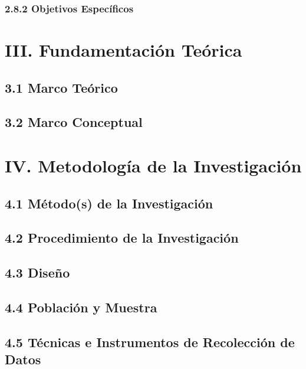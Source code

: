 \documentclass[12pt]{../componentes/uns}
\begin{document}
\subsubsection*{2.8.2 Objetivos Específicos}
\lipsum[12]

\section*{III. Fundamentación Teórica}

\subsection*{3.1 Marco Teórico}
\lipsum[13]

\subsection*{3.2 Marco Conceptual}
\lipsum[14]

\section*{IV. Metodología de la Investigación}

\subsection*{4.1 Método(s) de la Investigación}
\lipsum[15]

\subsection*{4.2 Procedimiento de la Investigación}
\lipsum[16]

\subsection*{4.3 Diseño}
\lipsum[17]

\subsection*{4.4 Población y Muestra}
\lipsum[18]

\subsection*{4.5 Técnicas e Instrumentos de Recolección de Datos}
\lipsum[19]
\end{document}
